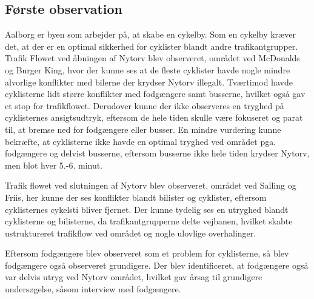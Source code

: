 \subsection{Første observation}
\label{sub:foerste_obs}
Aalborg er byen som arbejder på, at skabe en cykelby.%
Som en cykelby kræver det, at der er en optimal sikkerhed for cyklister blandt andre trafikantgrupper. Trafik Flowet ved åbningen af Nytorv blev observeret, området ved McDonalds og Burger King, hvor der kunne ses at de fleste cyklister havde nogle mindre alvorlige konflikter med bilerne der krydser Nytorv illegalt. Tværtimod havde cyklisterne lidt større konflikter med fodgængere samt busserne, hvilket også gav et stop for trafikflowet. Derudover kunne der ikke observeres en tryghed på cyklisternes ansigtsudtryk, eftersom de hele tiden skulle være fokuseret og parat til, at bremse ned for fodgængere eller busser. En mindre vurdering kunne bekræfte, at cyklisterne ikke havde en optimal tryghed ved området pga. fodgængere og delvist busserne, eftersom busserne ikke hele tiden krydser Nytorv, men blot hver 5.-6. minut.

Trafik flowet ved slutningen af Nytorv blev observeret, området ved Salling og Friis, her kunne der ses konflikter blandt bilister og cyklister, eftersom cyklisternes cykelsti bliver fjernet. Der kunne tydelig ses en utryghed blandt cyklisterne og bilisterne, da trafikantgrupperne delte vejbanen, hvilket skabte ustruktureret trafikflow ved området og nogle ulovlige overhalinger.

Eftersom fodgængere blev observeret som et problem for cyklisterne, så blev fodgængere også observeret grundigere. Der blev identificeret, at fodgængere også var delvis utryg ved Nytorv området, hvilket gav årsag til grundigere undersøgelse, såsom interview med fodgængere.

